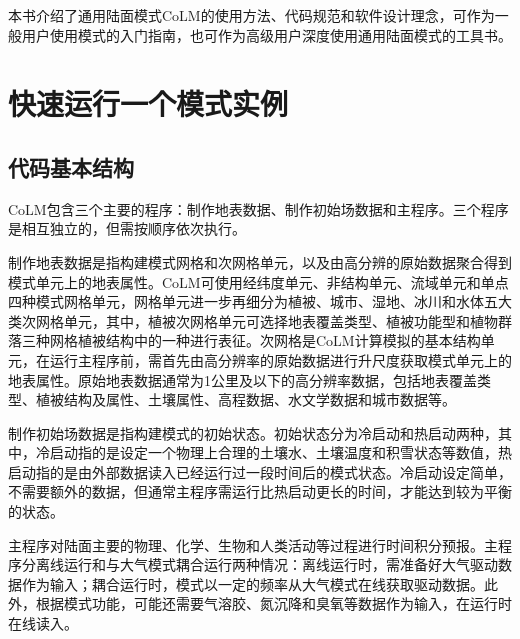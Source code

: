 \documentclass[a4paper,12pt,twoside]{article}
\begin{document}
本书介绍了通用陆面模式CoLM的使用方法、代码规范和软件设计理念，可作为一般用户使用模式的入门指南，也可作为高级用户深度使用通用陆面模式的工具书。


\section{快速运行一个模式实例}\label{chapter01}

\subsection{代码基本结构}

CoLM包含三个主要的程序：制作地表数据、制作初始场数据和主程序。三个程序是相互独立的，但需按顺序依次执行。

制作地表数据是指构建模式网格和次网格单元，以及由高分辨的原始数据聚合得到模式单元上的地表属性。CoLM可使用经纬度单元、非结构单元、流域单元和单点四种模式网格单元，网格单元进一步再细分为植被、城市、湿地、冰川和水体五大类次网格单元，其中，植被次网格单元可选择地表覆盖类型、植被功能型和植物群落三种网格植被结构中的一种进行表征。次网格是CoLM计算模拟的基本结构单元，在运行主程序前，需首先由高分辨率的原始数据进行升尺度获取模式单元上的地表属性。原始地表数据通常为1公里及以下的高分辨率数据，包括地表覆盖类型、植被结构及属性、土壤属性、高程数据、水文学数据和城市数据等。

制作初始场数据是指构建模式的初始状态。初始状态分为冷启动和热启动两种，其中，冷启动指的是设定一个物理上合理的土壤水、土壤温度和积雪状态等数值，热启动指的是由外部数据读入已经运行过一段时间后的模式状态。冷启动设定简单，不需要额外的数据，但通常主程序需运行比热启动更长的时间，才能达到较为平衡的状态。

主程序对陆面主要的物理、化学、生物和人类活动等过程进行时间积分预报。主程序分离线运行和与大气模式耦合运行两种情况：离线运行时，需准备好大气驱动数据作为输入；耦合运行时，模式以一定的频率从大气模式在线获取驱动数据。此外，根据模式功能，可能还需要气溶胶、氮沉降和臭氧等数据作为输入，在运行时在线读入。
\end{document}
